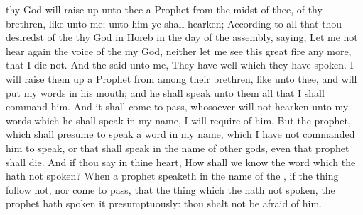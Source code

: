 {{} thy
God will raise
up unto thee a
Prophet from the
midst of thee, of thy
brethren, like unto me; unto him ye shall
hearken;
According to all that thou
desiredst of the
{} thy
God in
Horeb in the
day of the
assembly,
saying, Let me not
hear
again the
voice of the
{} my
God, neither let me
see this
great
fire any more, that I
die not.
And the
{}
said unto me, They have
well
{} which they have
spoken.
I will raise them
up a
Prophet from
among their
brethren, like unto thee, and will
put my
words in his
mouth; and he shall
speak unto them all that I shall
command him.
And it shall come to pass,
{}
whosoever will not
hearken unto my
words which he shall
speak in my
name, I will
require
{} of him.
But the
prophet, which shall
presume to
speak a
word in my
name, which I have not
commanded him to
speak, or that shall
speak in the
name of
other
gods, even that
prophet shall
die.
And if thou
say in thine
heart, How shall we
know the
word which the
{} hath not
spoken?
When a
prophet
speaketh in the
name of the
{}, if the
thing follow not, nor come to
pass, that
{} the
thing which the
{} hath not
spoken,
{} the
prophet hath
spoken it
presumptuously: thou shalt not be
afraid of him.

}
